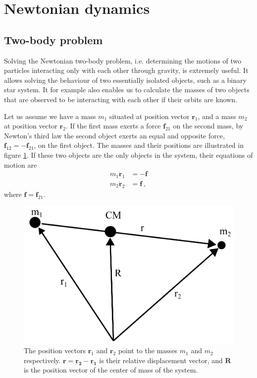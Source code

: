 \documentclass[english, oneside]{HYgradu}
\begin{document}
\section{Newtonian dynamics}

\subsection{Two-body problem}

Solving the Newtonian two-body problem, i.e. determining the motions of two particles interacting only with each other through gravity, is extremely useful. It allows solving the behaviour of two essentially isolated objects, such as a binary star system. It for example also enables us to calculate the masses of two objects that are observed to be interacting with each other if their orbits are known.

Let us assume we have a mass $m_1$ situated at position vector $\mathbf{r}_1$, and a mass $m_2$ at position vector $\mathbf{r}_2$. If the first mass exerts a force $\mathbf{f}_{21}$ on the second mass, by Newton's third law the second object exerts an equal and opposite force, $\mathbf{f}_{12} = -\mathbf{f}_{21}$, on the first object. The masses and their positions are illustrated in figure \ref{fig:2BodyProb}. If these two objects are the only objects in the system, their equations of motion are
\begin{align}
m_1 \mathbf{\ddot{r}}_1 &= -\mathbf{f} \label{equ:eom1} \\
m_2 \mathbf{\ddot{r}}_2 &= \mathbf{f} \label{equ:eom2} \ ,
\end{align}
where $\mathbf{f} = \mathbf{f}_{21}$.

\begin{figure}[h!tb]
\centering
\includegraphics[scale=0.5]{../images/2bp.pdf}
\caption{The position vectors $\mathbf{r}_1$ and $\mathbf{r}_2$ point to the masses $m_1$ and $m_2$ respectively. $\mbox{$\mathbf{r} = \mathbf{r_2} - \mathbf{r_1}$}$ is their relative displacement vector, and $\mathbf{R}$ is the position vector of the center of mass of the system.}
\label{fig:2BodyProb}
\end{figure}
\end{document}

